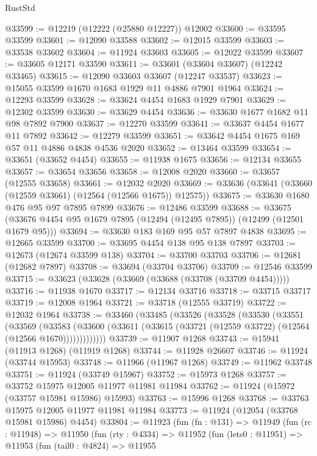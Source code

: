 \begin{lexlean}{RustStd}
\begin{coremodule}
{\begin{coremodule}
{{{{{{{{{{{{{{{{{{{{{{{{{{{{{{{{{{{{{{{{{{{{{{{{{{{{{{{{{{{{{{{{{{{{{{{{{{{{{{{{@33599 := @12219 (@12222 (@25880 @12227)) @12002
@33600 := @33595 @33599
@33601 := @12090 @33588
@33602 := @12015 @33599
@33603 := @33538 @33602
@33604 := @11924 @33603
@33605 := @12022 @33599
@33607 := @33605 @12171 @33590
@33611 := @33601 (@33604 @33607) (@12242 @33465)
@33615 := @12090 @33603 @33607 (@12247 @33537)
@33623 := @15055 @33599 @1670 @1683 @1929 @11 @4886 @7901 @1964
@33624 := @12293 @33599
@33628 := @33624 @4454 @1683 @1929 @7901
@33629 := @12302 @33599
@33630 := @33629 @4454
@33636 := @33630 @1677 @1682 @11 @98 @7892 @7900
@33637 := @12270 @33599
@33641 := @33637 @4454 @1677 @11 @7892
@33642 := @12279 @33599
@33651 := @33642 @4454 @1675 @169 @57 @11 @4886 @4838 @4536 @2020
@33652 := @13464 @33599
@33654 := @33651 (@33652 @4454)
@33655 := @11938 @1675
@33656 := @12134 @33655
@33657 := @33654 @33656
@33658 := @12008 @2020
@33660 := @33657 (@12555 @33658)
@33661 := @12032 @2020
@33669 := @33636 (@33641 (@33660 (@12559 @33661) (@12564 (@12566 @1675)) @12575))
@33675 := @33630 @1680 @476 @95 @97 @7895 @7899
@33676 := @12486 @33599
@33688 := @33675 (@33676 @4454 @95 @1679 @7895 (@12494 (@12495 @7895)) (@12499 (@12501 @1679 @95)))
@33694 := @33630 @183 @169 @95 @57 @7897 @4838
@33695 := @12665 @33599
@33700 := @33695 @4454 @138 @95 @138 @7897
@33703 := @12673 (@12674 @33599 @138)
@33704 := @33700 @33703
@33706 := @12681 (@12682 @7897)
@33708 := @33694 (@33704 @33706)
@33709 := @12546 @33599
@33715 := @33623 (@33628 (@33669 (@33688 (@33708 (@33709 @4454)))))
@33716 := @11938 @1670
@33717 := @12134 @33716
@33718 := @33715 @33717
@33719 := @12008 @1964
@33721 := @33718 (@12555 @33719)
@33722 := @12032 @1964
@33738 := @33460
    (@33485
      (@33526
        (@33528
          (@33530
            (@33551
              (@33569
                (@33583
                  (@33600 (@33611 (@33615 (@33721 (@12559 @33722) (@12564 (@12566 @1670)))))))))))))
@33739 := @11907 @1268
@33743 := @15941 (@11913 @1268) (@11919 @1268)
@33744 := @11928 @26607
@33746 := @11924 (@33744 @15953)
@33748 := @11966 (@11967 @1268)
@33749 := @11962 @33748
@33751 := @11924 (@33749 @15967)
@33752 := @15973 @1268
@33757 := @33752 @15975 @12005 @11977 @11981 @11984
@33762 := @11924 (@15972 (@33757 @15981 @15986) @15993)
@33763 := @15996 @1268
@33768 := @33763 @15975 @12005 @11977 @11981 @11984
@33773 := @11924 (@12054 (@33768 @15981 @15986) @4454)
@33804 := @11923
    (fun (fn : @131) =>
    @11949
      (fun (rc : @11948) =>
      @11950
        (fun (rty : @4334) =>
        @11952
          (fun (lets0 : @11951) =>
          @11953
            (fun (tail0 : @4824) =>
            @11955
}}}}}}}}}}}}}}}}}}}}}}}}}}}}}}}}}}}}}}}}}}}}}}}}}}}}}}}}}}}}}}}}}}}}}}}}}}}}}}}}
\end{coremodule}}
\end{coremodule}
\end{lexlean}
